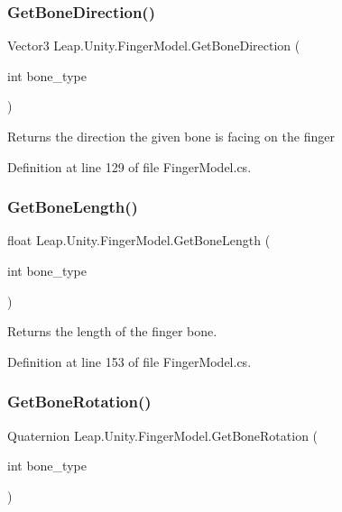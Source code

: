 \subsubsection{\texorpdfstring{GetBoneDirection()}{GetBoneDirection()}}
{\footnotesize\ttfamily Vector3 Leap.\+Unity.\+Finger\+Model.\+Get\+Bone\+Direction (\begin{DoxyParamCaption}\item[{int}]{bone\+\_\+type }\end{DoxyParamCaption})}

Returns the direction the given bone is facing on the finger 

Definition at line 129 of file Finger\+Model.\+cs.

\mbox{\label{class_leap_1_1_unity_1_1_finger_model_acd58685c52b4bf4dc85e19597dc4de56}} 
\subsubsection{\texorpdfstring{GetBoneLength()}{GetBoneLength()}}
{\footnotesize\ttfamily float Leap.\+Unity.\+Finger\+Model.\+Get\+Bone\+Length (\begin{DoxyParamCaption}\item[{int}]{bone\+\_\+type }\end{DoxyParamCaption})}

Returns the length of the finger bone. 

Definition at line 153 of file Finger\+Model.\+cs.

\mbox{\label{class_leap_1_1_unity_1_1_finger_model_a1d84c11cb9e8a1096225718bcd759ceb}} 
\subsubsection{\texorpdfstring{GetBoneRotation()}{GetBoneRotation()}}
{\footnotesize\ttfamily Quaternion Leap.\+Unity.\+Finger\+Model.\+Get\+Bone\+Rotation (\begin{DoxyParamCaption}\item[{int}]{bone\+\_\+type }\end{DoxyParamCaption})}

